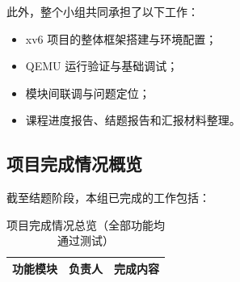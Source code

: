 \documentclass[12pt,a4paper]{ctexart}
\begin{document}
此外，整个小组共同承担了以下工作：
\begin{itemize}
  \item xv6 项目的整体框架搭建与环境配置；
  \item QEMU 运行验证与基础调试；
  \item 模块间联调与问题定位；
  \item 课程进度报告、结题报告和汇报材料整理。
\end{itemize}

\subsection{项目完成情况概览}

截至结题阶段，本组已完成的工作包括：

\begin{table}[H]
\centering
\caption{项目完成情况总览（全部功能均通过测试）}
\small
\begin{tabular}{>{\bfseries}p{2.5cm}p{2.2cm}p{8.8cm}}
\toprule
\textbf{功能模块} & \textbf{负责人} & \textbf{完成内容} \\
\midrule


\end{tabular}
\end{table}
\end{document}
